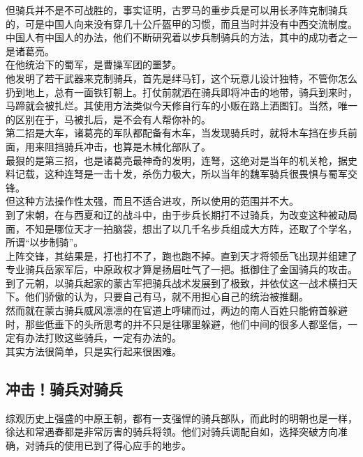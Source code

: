 \begin{multicols}{\theparacolNo}
但骑兵并不是不可战胜的，事实证明，古罗马的重步兵是可以用长矛阵克制骑兵的，可是中国人向来没有穿几十公斤盔甲的习惯，而且当时并没有中西交流制度。中国人有中国人的办法，他们不断研究着以步兵制骑兵的方法，其中的成功者之一是诸葛亮。\\

在他统治下的蜀军，是曹操军团的噩梦。\\

他发明了若干武器来克制骑兵，首先是绊马钉，这个玩意儿设计独特，不管你怎么扔到地上，总有一面铁钉朝上。打仗前就洒在骑兵即将冲击的地带，骑兵到来时，马蹄就会被扎烂。其使用方法类似今天修自行车的小贩在路上洒图钉。当然，唯一的区别在于，马被扎后，是不会有人帮你补的。\\

第二招是大车，诸葛亮的军队都配备有木车，当发现骑兵时，就将木车挡在步兵前面，用来阻挡骑兵冲击，也算是木械化部队了。\\

最狠的是第三招，也是诸葛亮最神奇的发明，连弩，这绝对是当年的机关枪，据史料记载，这种连弩是一击十发，杀伤力极大，所以当年的魏军骑兵很畏惧与蜀军交锋。\\

但这种方法操作性太强，而且不适合进攻，所以使用的范围并不大。\\

到了宋朝，在与西夏和辽的战斗中，由于步兵长期打不过骑兵，为改变这种被动局面，不知是哪位天才一拍脑袋，想出了以几千名步兵组成大方阵，还取了个学名，所谓“以步制骑”。\\

上阵交锋，其结果是，打也打不了，跑也跑不掉。直到天才将领岳飞出现并组建了专业骑兵岳家军后，中原政权才算是扬眉吐气了一把。抵御住了金国骑兵的攻击。\\

到了元朝，以骑兵起家的蒙古军把骑兵战术发展到了极致，并依仗这一战术横扫天下。他们骄傲的认为，只要自己有马，就不用担心自己的统治被推翻。\\

然而就在蒙古骑兵威风凛凛的在官道上呼啸而过，两边的南人百姓只能俯首躲避时，那些低垂下的头所思考的并不只是往哪里躲避，他们中间的很多人都坚信，一定有办法打败这些骑兵，一定有办法的。\\

其实方法很简单，只是实行起来很困难。\\

\subsection{冲击！骑兵对骑兵}
综观历史上强盛的中原王朝，都有一支强悍的骑兵部队，而此时的明朝也是一样，徐达和常遇春都是非常厉害的骑兵将领。他们对骑兵调配自如，选择突破方向准确，对骑兵的使用已到了得心应手的地步。\\


\end{multicols}
